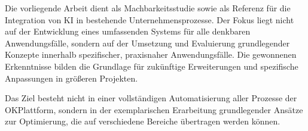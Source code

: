 Die vorliegende Arbeit dient als Machbarkeitsstudie sowie als Referenz für die Integration von KI in bestehende Unternehmensprozesse. Der Fokus liegt nicht auf der Entwicklung eines umfassenden Systems für alle denkbaren Anwendungsfälle, sondern auf der Umsetzung und Evaluierung grundlegender Konzepte innerhalb spezifischer, praxisnaher Anwendungsfälle. Die gewonnenen Erkenntnisse bilden die Grundlage für zukünftige Erweiterungen und spezifische Anpassungen in größeren Projekten.

Das Ziel besteht nicht in einer vollständigen Automatisierung aller Prozesse der OKPlattform, sondern in der exemplarischen Erarbeitung grundlegender Ansätze zur Optimierung, die auf verschiedene Bereiche übertragen werden können.